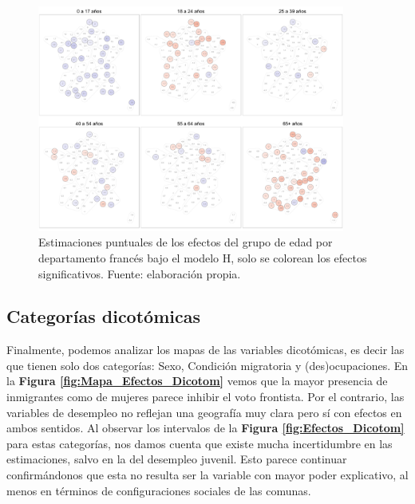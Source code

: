 \begin{figure}
	\centering
	\includegraphics[width = 0.9\textwidth]{Figs/Efectos/Dorling_Efectos_Edad_Modelo_H}
	\caption{Estimaciones puntuales de los efectos del grupo de edad por departamento francés bajo el modelo H, solo se colorean los efectos significativos. Fuente: elaboración propia.}
	\label{fig:Dorling_Efectos_Edad}
\end{figure}

\subsection{Categorías dicotómicas}

Finalmente, podemos analizar los mapas de las variables dicotómicas, es decir las que tienen solo dos categorías: Sexo, Condición migratoria y (des)ocupaciones. En la \textbf{Figura \ref{fig:Mapa_Efectos_Dicotom}} vemos que la mayor presencia de inmigrantes como de mujeres parece inhibir el voto frontista. Por el contrario, las variables de desempleo no reflejan una geografía muy clara pero sí con efectos en ambos sentidos. Al observar los intervalos de la \textbf{Figura \ref{fig:Efectos_Dicotom}} para estas categorías, nos damos cuenta que existe mucha incertidumbre en las estimaciones, salvo en la del desempleo juvenil. Esto parece continuar confirmándonos que esta no resulta ser la variable con mayor poder explicativo, al menos en términos de configuraciones sociales de las comunas.\\ 

